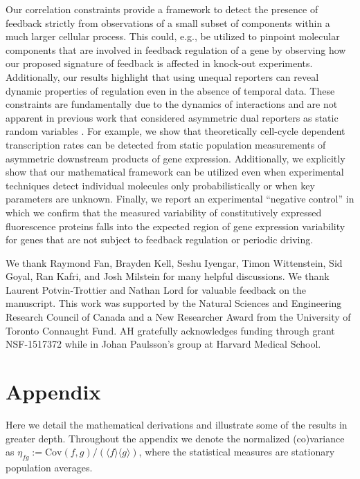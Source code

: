\documentclass[%
 reprint,prx,
superscriptaddress,
%
%
%
%
%
%
%
%
%
 amsmath,amssymb,
 aps,
%
%
%
%
%
%
]{revtex4-2}
\newcommand{\lb}{\langle}
\newcommand{\rb}{\rangle}
\begin{document}
Our correlation constraints provide a framework to detect the presence of feedback strictly from observations of a small subset of components within a much larger cellular process. This could, e.g., be utilized to pinpoint molecular components that are involved in feedback regulation of a gene by observing how our proposed signature of feedback is affected in knock-out experiments. Additionally, our results highlight that using unequal reporters can reveal dynamic properties of regulation even in the absence of temporal data. These constraints are fundamentally due to the dynamics of interactions and are not apparent in previous work that considered asymmetric dual reporters as static random variables \cite{Rhee2014}.
%
For example, we show that theoretically cell-cycle dependent transcription rates can be detected from static population measurements of asymmetric downstream products of gene expression. Additionally, we explicitly show that our mathematical framework can be utilized even when experimental techniques detect individual molecules only probabilistically or when key parameters are unknown.  
{Finally, we report an experimental ``negative control'' in which we confirm that the measured variability of constitutively expressed fluorescence proteins falls into the expected region of gene expression variability for genes that are not subject to feedback regulation or periodic driving.}

\begin{acknowledgments}
\vspace{-1em}
We thank Raymond Fan, Brayden Kell, Seshu Iyengar, Timon Wittenstein, Sid Goyal, Ran Kafri, and Josh Milstein for many helpful discussions. We thank Laurent Potvin-Trottier and Nathan Lord for valuable feedback on the manuscript. This work was supported by the Natural Sciences and Engineering Research Council of Canada and a New Researcher Award from the University of Toronto Connaught Fund. %
AH gratefully acknowledges funding through grant NSF-1517372 while in Johan Paulsson's group at Harvard Medical School.
\end{acknowledgments}

\appendix

\section*{Appendix}
\vspace{-1em}
Here we detail the mathematical derivations and illustrate some of the results in greater depth. {Throughout the appendix we denote the normalized (co)variance as \mbox{$\eta_{fg}:= \text{Cov}(f,g)/(\lb f \rb \lb g \rb)$}, where the statistical measures are stationary population averages.}
\end{document}
